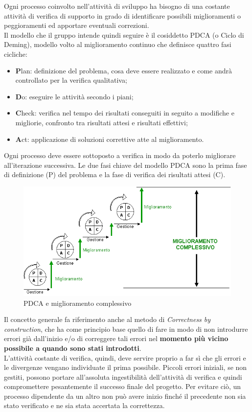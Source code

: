 \documentclass[a4paper,11pt]{article}
\begin{document}
Ogni processo coinvolto nell'attività di sviluppo ha bisogno di una costante attività di verifica di supporto in grado di identificare possibili miglioramenti o peggioramenti ed apportare eventuali correzioni. \\
Il modello che il gruppo intende quindi seguire è il cosiddetto PDCA (o Ciclo di Deming), modello volto al miglioramento continuo che definisce quattro fasi cicliche:
\begin{itemize}
\item \textbf{P}lan: definizione del problema, cosa deve essere realizzato e come andrà controllato per la verifica qualitativa;
\item \textbf{D}o: eseguire le attività secondo i piani;
\item \textbf{C}heck: verifica nel tempo dei risultati conseguiti in seguito a modifiche e migliorie, confronto tra risultati attesi e risultati effettivi; %
\item \textbf{A}ct: applicazione di soluzioni correttive atte al miglioramento.
\end{itemize}
Ogni processo deve essere sottoposto a verifica in modo da poterlo migliorare all'iterazione successiva. 
Le due fasi chiave del modello PDCA sono la prima fase di definizione (P) del problema e la fase di verifica dei risultati attesi (C). 
\begin{figure}[h!]
\centering
\includegraphics[scale=0.6]{../images/PDCA}
\caption{PDCA e miglioramento complessivo}
\end{figure}
Il concetto generale fa riferimento anche al metodo di \textit{Correctness by construction}, che ha come principio base quello di fare in modo di non introdurre errori già dall'inizio e/o di correggere tali errori nel \textbf{momento più vicino possibile a quando sono stati introdotti}.\\ L'attività costante di verifica, quindi,  deve servire proprio a far sì che gli errori e le divergenze vengano individuate il prima possibile.
Piccoli errori iniziali, se non gestiti, possono portare all'assoluta ingestibilità dell'attività di verifica e quindi compromettere pesantemente il successo finale del progetto. Per evitare ciò, un processo dipendente da un altro non può avere inizio finché il precedente non sia stato verificato e ne sia stata accertata la correttezza. 
\end{document}
